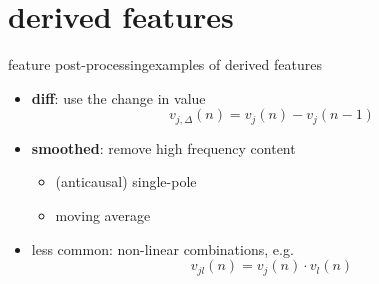     \section[derived]{derived features}
		\begin{frame}{feature post-processing}{examples of derived features}
            \begin{itemize}
                \item   \textbf{diff}: use the change in value
                    \begin{equation*}
                        v_{j,\Delta}(n) = v_j(n) - v_j(n-1) 
                    \end{equation*}
                \smallskip
                \item<2-> \textbf{smoothed}: remove high frequency content
                    \begin{itemize}
                        \item	 (anticausal) single-pole
                        \item	moving average
                    \end{itemize}
                \bigskip
                \item<3->   less common: non-linear combinations, e.g.
                    \begin{equation*}
                        v_{jl}(n) = v_j(n) \cdot v_l(n) 
                    \end{equation*}
            \end{itemize}
		\end{frame}


